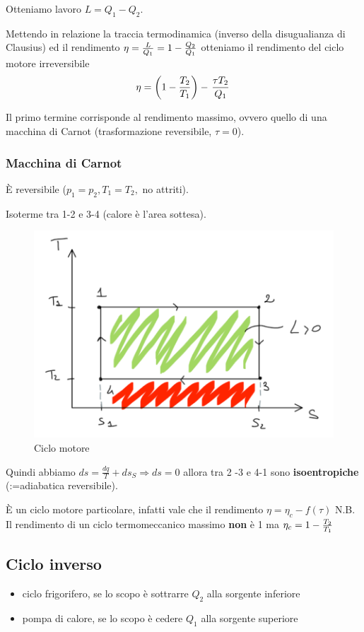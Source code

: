 \documentclass[a4paper]{article}
\numberwithin{equation}{section}%
\begin{document}
Otteniamo lavoro $L=Q_1-Q_2$.

Mettendo in relazione la traccia termodinamica (inverso della disugualianza di Clausius) ed il rendimento $\eta={L\over Q_1}={1-{Q_2\over Q_1}}$ otteniamo il rendimento del ciclo motore irreversibile 
\begin{equation}
	\eta=\left(1-{T_2\over T_1}\right)-\left. \tau T_2\over Q_1\right.
\end{equation}

Il primo termine corrisponde al rendimento massimo, ovvero quello di una macchina di Carnot (trasformazione reversibile, $\tau =0$).

\subsubsection{Macchina di Carnot}

È reversibile ($p_1=p_2,T_1=T_2,$ no attriti).

Isoterme tra 1-2 e 3-4 (calore è l'area sottesa).

\begin{figure}[H]
	\begin{center}
		
		\includegraphics[width=0.4\columnwidth]{carnot.png}
		\caption{Ciclo motore}
	\end{center}
\end{figure}

Quindi abbiamo $d s=\frac{d q}{T}+d s_{S} \Rightarrow d s=0$ allora tra 2 -3 e 4-1 sono\textbf{ isoentropiche} (:=adiabatica reversibile).

È un ciclo motore particolare, infatti vale che il rendimento $\eta = \eta_c-f\left(\tau\right)$
N.B. Il rendimento di un ciclo termomeccanico massimo \textbf{non} è 1 ma $\eta_c =1-{T_2\over T_1}$

\subsection{Ciclo inverso}

\begin{itemize}
	\item ciclo frigorifero, se lo scopo è sottrarre $Q_2$ alla sorgente inferiore
	\item pompa di calore, se lo scopo è cedere $Q_1$ alla sorgente superiore
\end{itemize}
\end{document}
